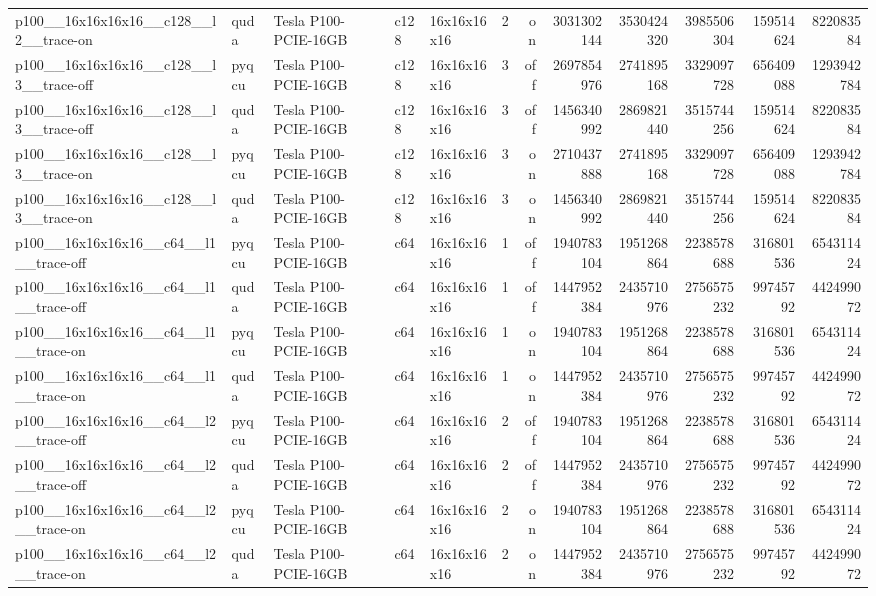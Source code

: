 \begin{table}[htbp]
\begin{tabular}{@{}lllllrrrrrrr@{}}
p100\_\_16x16x16x16\_\_c128\_\_l2\_\_trace-on & quda & Tesla P100-PCIE-16GB & c128 & 16x16x16x16 & 2 & on & 3031302144 & 3530424320 & 3985506304 & 159514624 & 822083584 \\
p100\_\_16x16x16x16\_\_c128\_\_l3\_\_trace-off & pyqcu & Tesla P100-PCIE-16GB & c128 & 16x16x16x16 & 3 & off & 2697854976 & 2741895168 & 3329097728 & 656409088 & 1293942784 \\
p100\_\_16x16x16x16\_\_c128\_\_l3\_\_trace-off & quda & Tesla P100-PCIE-16GB & c128 & 16x16x16x16 & 3 & off & 1456340992 & 2869821440 & 3515744256 & 159514624 & 822083584 \\
p100\_\_16x16x16x16\_\_c128\_\_l3\_\_trace-on & pyqcu & Tesla P100-PCIE-16GB & c128 & 16x16x16x16 & 3 & on & 2710437888 & 2741895168 & 3329097728 & 656409088 & 1293942784 \\
p100\_\_16x16x16x16\_\_c128\_\_l3\_\_trace-on & quda & Tesla P100-PCIE-16GB & c128 & 16x16x16x16 & 3 & on & 1456340992 & 2869821440 & 3515744256 & 159514624 & 822083584 \\
p100\_\_16x16x16x16\_\_c64\_\_l1\_\_trace-off & pyqcu & Tesla P100-PCIE-16GB & c64 & 16x16x16x16 & 1 & off & 1940783104 & 1951268864 & 2238578688 & 316801536 & 654311424 \\
p100\_\_16x16x16x16\_\_c64\_\_l1\_\_trace-off & quda & Tesla P100-PCIE-16GB & c64 & 16x16x16x16 & 1 & off & 1447952384 & 2435710976 & 2756575232 & 99745792 & 442499072 \\
p100\_\_16x16x16x16\_\_c64\_\_l1\_\_trace-on & pyqcu & Tesla P100-PCIE-16GB & c64 & 16x16x16x16 & 1 & on & 1940783104 & 1951268864 & 2238578688 & 316801536 & 654311424 \\
p100\_\_16x16x16x16\_\_c64\_\_l1\_\_trace-on & quda & Tesla P100-PCIE-16GB & c64 & 16x16x16x16 & 1 & on & 1447952384 & 2435710976 & 2756575232 & 99745792 & 442499072 \\
p100\_\_16x16x16x16\_\_c64\_\_l2\_\_trace-off & pyqcu & Tesla P100-PCIE-16GB & c64 & 16x16x16x16 & 2 & off & 1940783104 & 1951268864 & 2238578688 & 316801536 & 654311424 \\
p100\_\_16x16x16x16\_\_c64\_\_l2\_\_trace-off & quda & Tesla P100-PCIE-16GB & c64 & 16x16x16x16 & 2 & off & 1447952384 & 2435710976 & 2756575232 & 99745792 & 442499072 \\
p100\_\_16x16x16x16\_\_c64\_\_l2\_\_trace-on & pyqcu & Tesla P100-PCIE-16GB & c64 & 16x16x16x16 & 2 & on & 1940783104 & 1951268864 & 2238578688 & 316801536 & 654311424 \\
p100\_\_16x16x16x16\_\_c64\_\_l2\_\_trace-on & quda & Tesla P100-PCIE-16GB & c64 & 16x16x16x16 & 2 & on & 1447952384 & 2435710976 & 2756575232 & 99745792 & 442499072 \\

\end{tabular}
\end{table}
